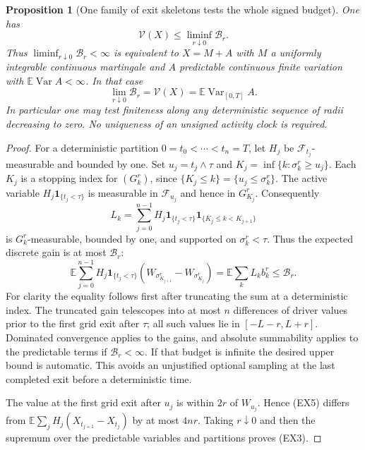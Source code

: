 \documentclass[11pt]{article}
\newtheorem{proposition}[theorem]{Proposition}
\theoremstyle{definition}\newtheorem{definition}[theorem]{Definition}
\theoremstyle{remark}\newtheorem{remark}[theorem]{Remark}
\begin{document}
\begin{proposition}[One family of exit skeletons tests the whole signed budget]
\label{prop:exit-budget-exact}
One has
\[
 \mathcal V(X)\le\liminf_{r\downarrow0}\mathcal B_r.
 \tag{EX3}
\]
Thus $\liminf_{r\downarrow0}\mathcal B_r<\infty$ is equivalent to
$X=M+A$ with $M$ a uniformly integrable continuous martingale and
$A$ predictable continuous finite variation with
$\mathbb E\operatorname{Var}A<\infty$. In that case
\[
 \lim_{r\downarrow0}\mathcal B_r
   =\mathcal V(X)=\mathbb E\operatorname{Var}_{[0,T]}A.
 \tag{EX4}
\]
In particular one may test finiteness along any deterministic sequence
of radii decreasing to zero.  No uniqueness of an unsigned activity clock
is required.
\end{proposition}
\begin{proof}
For a deterministic partition $0=t_0<\cdots<t_n=T$, let $H_j$ be
$\mathcal F_{t_j}$-measurable and bounded by one. Set $u_j=t_j\wedge\tau$
and $K_j=\inf\{k:\sigma^r_k\ge u_j\}$. Each $K_j$ is a stopping index
for $(G^r_k)$, since $\{K_j\le k\}=\{u_j\le\sigma^r_k\}$.
The active variable $H_j\mathbf1_{\{t_j<\tau\}}$ is measurable in
$\mathcal F_{u_j}$ and hence in $G^r_{K_j}$. Consequently
\[
 L_k=\sum_{j=0}^{n-1}H_j\mathbf1_{\{t_j<\tau\}}
                      \mathbf1_{\{K_j\le k<K_{j+1}\}}
\]
is $G^r_k$-measurable, bounded by one, and supported on $\sigma^r_k<\tau$.
Thus the expected discrete gain is at most $\mathcal B_r$:
\[
 \mathbb E\sum_{j=0}^{n-1}H_j\mathbf1_{\{t_j<\tau\}}
       (W_{\sigma^r_{K_{j+1}}}-W_{\sigma^r_{K_j}})
       =\mathbb E\sum_kL_k b^r_k\le\mathcal B_r.
 \tag{EX5}
\]
For clarity the equality follows first after truncating the sum at a
deterministic index. The truncated gain telescopes into at most $n$
differences of driver values prior to the first grid exit after $\tau$;
all such values lie in $[-L-r,L+r]$. Dominated convergence applies to
the gains, and absolute summability applies to the predictable terms if
$\mathcal B_r<\infty$. If that budget is infinite the desired upper
bound is automatic. This avoids an unjustified optional sampling at the
last completed exit before a deterministic time.

The value at the first grid exit after $u_j$ is within $2r$ of $W_{u_j}$.
Hence (EX5) differs from
$\mathbb E\sum_jH_j(X_{t_{j+1}}-X_{t_j})$ by at most $4nr$.
Taking $r\downarrow0$ and then the supremum over the predictable
variables and partitions proves (EX3).


\end{proof}
\end{document}
